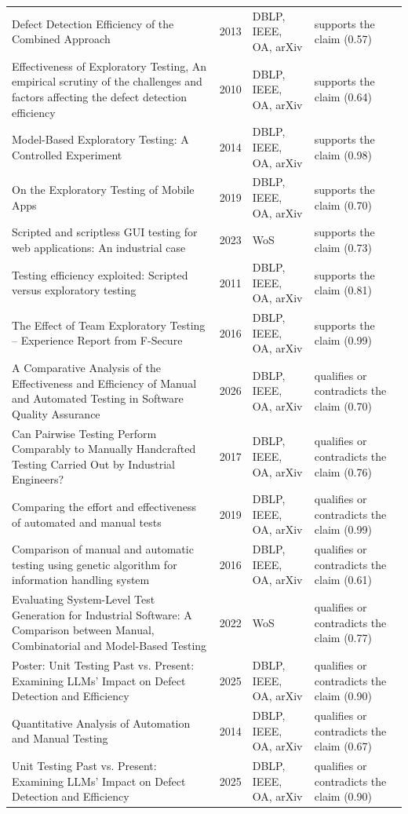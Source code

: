 \begin{longtable}{@{}%
  >{\raggedright\arraybackslash}p{}c%
  >{\raggedright\arraybackslash}p{}%
  >{\raggedright\arraybackslash}p{}@{}}
Defect Detection Efficiency of the Combined Approach & 2013 & DBLP, IEEE, OA, arXiv & supports the claim (0.57) \\
Effectiveness of Exploratory Testing, An empirical scrutiny of the challenges and factors affecting the defect detection efficiency & 2010 & DBLP, IEEE, OA, arXiv & supports the claim (0.64) \\
Model-Based Exploratory Testing: A Controlled Experiment & 2014 & DBLP, IEEE, OA, arXiv & supports the claim (0.98) \\
On the Exploratory Testing of Mobile Apps & 2019 & DBLP, IEEE, OA, arXiv & supports the claim (0.70) \\
Scripted and scriptless GUI testing for web applications: An industrial case & 2023 & WoS & supports the claim (0.73) \\
Testing efficiency exploited: Scripted versus exploratory testing & 2011 & DBLP, IEEE, OA, arXiv & supports the claim (0.81) \\
The Effect of Team Exploratory Testing -- Experience Report from F-Secure & 2016 & DBLP, IEEE, OA, arXiv & supports the claim (0.99) \\
A Comparative Analysis of the Effectiveness and Efficiency of Manual and Automated Testing in Software Quality Assurance & 2026 & DBLP, IEEE, OA, arXiv & qualifies or contradicts the claim (0.70) \\
Can Pairwise Testing Perform Comparably to Manually Handcrafted Testing Carried Out by Industrial Engineers? & 2017 & DBLP, IEEE, OA, arXiv & qualifies or contradicts the claim (0.76) \\
Comparing the effort and effectiveness of automated and manual tests & 2019 & DBLP, IEEE, OA, arXiv & qualifies or contradicts the claim (0.99) \\
Comparison of manual and automatic testing using genetic algorithm for information handling system & 2016 & DBLP, IEEE, OA, arXiv & qualifies or contradicts the claim (0.61) \\
Evaluating System-Level Test Generation for Industrial Software: A Comparison between Manual, Combinatorial and Model-Based Testing & 2022 & WoS & qualifies or contradicts the claim (0.77) \\
Poster: Unit Testing Past vs. Present: Examining LLMs' Impact on Defect Detection and Efficiency & 2025 & DBLP, IEEE, OA, arXiv & qualifies or contradicts the claim (0.90) \\
Quantitative Analysis of Automation and Manual Testing & 2014 & DBLP, IEEE, OA, arXiv & qualifies or contradicts the claim (0.67) \\
Unit Testing Past vs. Present: Examining LLMs' Impact on Defect Detection and Efficiency & 2025 & DBLP, IEEE, OA, arXiv & qualifies or contradicts the claim (0.90) \\
\end{longtable}
\endgroup

